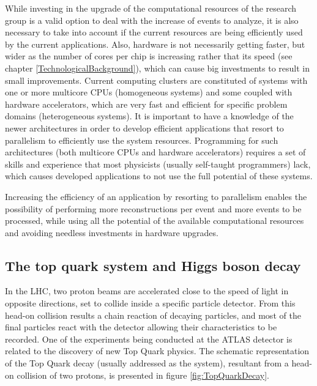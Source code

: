 While investing in the upgrade of the computational resources of the research group is a valid option to deal with the increase of events to analyze, it is also necessary to take into account if the current resources are being efficiently used by the current applications. Also, hardware is not necessarily getting faster, but wider as the number of cores per chip is increasing rather that its speed (see chapter \ref{TechnologicalBackground}), which can cause big investments to result in small improvements. Current computing clusters are constituted of systems with one or more multicore CPUs (homogeneous systems) and some coupled with hardware accelerators, which are very fast and efficient for specific problem domains (heterogeneous systems). It is important to have a knowledge of the newer architectures in order to develop efficient applications that resort to parallelism to efficiently use the system resources. Programming for such architectures (both multicore CPUs and hardware accelerators) requires a set of skills and experience that most physicists (usually self-taught programmers) lack, which causes developed applications to not use the full potential of these systems.

Increasing the efficiency of an application by resorting to parallelism enables the possibility of performing more reconstructions per event and more events to be processed, while using all the potential of the available computational resources and avoiding needless investments in hardware upgrades.

\subsection{The top quark system and Higgs boson decay}
\label{TopQuarkSystem}

In the LHC, two proton beams are accelerated close to the speed of light in opposite directions, set to collide inside a specific particle detector. From this head-on collision results a chain reaction of decaying particles, and most of the final particles react with the detector allowing their characteristics to be recorded. One of the experiments being conducted at the ATLAS detector is related to the discovery of new Top Quark physics. The schematic representation of the Top Quark decay (usually addressed as the \ttbar system), resultant from a head-on collision of two protons, is presented in figure \ref{fig:TopQuarkDecay}.


